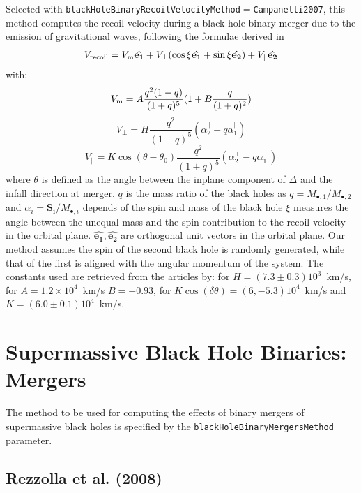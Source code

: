 Selected with {\tt blackHoleBinaryRecoilVelocityMethod}$=${\tt Campanelli2007}, this method computes the recoil velocity during a black hole binary merger due to the emission of gravitational waves, following the formulae derived in \cite {campanelli_large_2007}
\begin{equation}
V_{\rm recoil}=V_{\rm m}\mathbf{\hat{e_1}}+V_\perp(\cos\xi\mathbf{\hat{e_1}}+\sin\xi\mathbf{\hat{e_2}})+V_\parallel\mathbf{\hat{e_2}} 
\end{equation}
with:
\begin{equation}
V_{\rm m}=A\frac{q^2(1-q)}{(1+q)^5}(1+B\frac{q}{(1+q)^2})
\end{equation}
\begin{equation}
V_\perp=H\frac{q^2}{(1+q)^5}(\alpha^\parallel_2-q\alpha^\parallel_1)
\end{equation}
\begin{equation}
V_\parallel=K\cos(\theta-\theta_0)\frac{q^2}{(1+q)^5}(\alpha^\perp_2-q\alpha^\perp_1)
\end{equation}
where $\theta$ is defined as the angle between the inplane \gls{component} of $\Delta$ and the infall direction at merger. $q$ is the mass ratio of the black holes as $q=M_{\bullet,1}/M_{\bullet,2}$ and $\alpha_i=\mathbf{S_i}/M_{\bullet,i}$ depends of the spin and mass of the black hole $\xi$ measures the angle between the unequal mass and the spin contribution to the recoil velocity in the orbital plane. $\mathbf{\hat{e_1}} , \mathbf{\hat{e_2}}$ are orthogonal unit vectors in the orbital plane. Our method assumes the spin of the second black hole is randomly generated, while that of the first is aligned with the angular momentum of the system. The constants used are retrieved from the articles by: \cite{koppitz_recoil_2007} for $H=(7.3\pm 0.3)10^3$~km/s, \cite{gonzalez_maximum_2007} for $A=1.2 \times 10^4$~km/s $B=-0.93$, \cite{gonzalez_supermassive_2007} for $K\cos(\delta\theta)=(6,-5.3)10^4$~km/s and $K=(6.0\pm 0.1)10^4$~km/s.

\section{Supermassive Black Hole Binaries: Mergers}

The method to be used for computing the effects of binary mergers of supermassive black holes is specified by the {\tt blackHoleBinaryMergersMethod} parameter.

\subsection{Rezzolla et al. (2008)}

